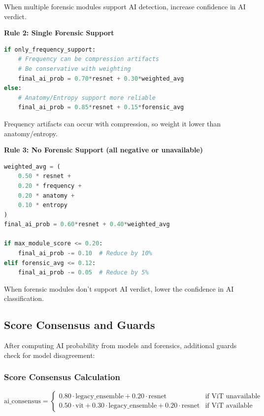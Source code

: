 \documentclass[12pt,a4paper]{book}
\begin{document}
When multiple forensic modules support AI detection, increase confidence in AI verdict.

\textbf{Rule 2: Single Forensic Support}

\begin{lstlisting}[language=Python]
if only_frequency_support:
    # Frequency can be compression artifacts
    # Be conservative with weighting
    final_ai_prob = 0.70*resnet + 0.30*weighted_avg
else:
    # Anatomy/Entropy support more reliable
    final_ai_prob = 0.85*resnet + 0.15*forensic_avg
\end{lstlisting}

Frequency artifacts can occur with compression, so weight it lower than anatomy/entropy.

\textbf{Rule 3: No Forensic Support (all negative or unavailable)}

\begin{lstlisting}[language=Python]
weighted_avg = (
    0.50 * resnet +
    0.20 * frequency +
    0.20 * anatomy +
    0.10 * entropy
)
final_ai_prob = 0.60*resnet + 0.40*weighted_avg

if max_module_score <= 0.20:
    final_ai_prob -= 0.10  # Reduce by 10%
elif forensic_avg <= 0.12:
    final_ai_prob -= 0.05  # Reduce by 5%
\end{lstlisting}

When forensic modules don't support AI verdict, lower the confidence in AI classification.

\subsection{Score Consensus and Guards}

After computing AI probability from models and forensics, additional guards check for model disagreement:

\subsubsection{Score Consensus Calculation}

\begin{equation}
\text{ai\_consensus} = \begin{cases}
0.80 \cdot \text{legacy\_ensemble} + 0.20 \cdot \text{resnet} & \text{if ViT unavailable} \\
0.50 \cdot \text{vit} + 0.30 \cdot \text{legacy\_ensemble} + 0.20 \cdot \text{resnet} & \text{if ViT available}
\end{cases}
\end{equation}
\end{document}
